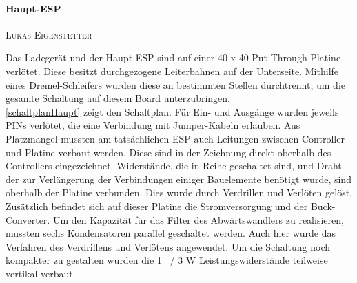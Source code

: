 \documentclass[12pt,a4paper,bibliography=totocnumbered,listof=totocnumbered]{article}
\makeatletter
\newcommand{\chapterauthor}[1]{%
  {\parindent0pt\vspace*{-5pt}%
  \linespread{1.1}\small\scshape#1%
  \par\nobreak\vspace*{3pt}}
  \@afterheading%
}
\makeatother
\begin{document}
\paragraph{Haupt-ESP}
\chapterauthor{Lukas Eigenstetter}
Das Ladegerät und der Haupt-ESP sind auf einer 40 x 40 Put-Through Platine verlötet.
Diese besitzt durchgezogene Leiterbahnen auf der Unterseite.
Mithilfe eines Dremel-Schleifers wurden diese an bestimmten Stellen durchtrennt, um die gesamte Schaltung auf diesem Board unterzubringen.\\
\autoref{schaltplanHaupt} zeigt den Schaltplan.
Für Ein- und Ausgänge wurden jeweils PINs verlötet, die eine Verbindung mit Jumper-Kabeln erlauben.
Aus Platzmangel mussten am tatsächlichen ESP auch Leitungen zwischen Controller und Platine verbaut werden.
Diese sind in der Zeichnung direkt oberhalb des Controllers eingezeichnet.
Widerstände, die in Reihe geschaltet sind, und Draht der zur Verlängerung der Verbindungen einiger Bauelemente benötigt wurde, sind oberhalb der Platine verbunden.
Dies wurde durch Verdrillen und Verlöten gelöst.\\
Zusätzlich befindet sich auf dieser Platine die Stromversorgung und der Buck-Converter.
Um den Kapazität für das Filter des Abwärtswandlers zu realisieren, mussten sechs Kondensatoren parallel geschaltet werden.
Auch hier wurde das Verfahren des Verdrillens und Verlötens angewendet.
Um die Schaltung noch kompakter zu gestalten wurden die 1 \textOmega \ / 3 W Leistungswiderstände teilweise vertikal verbaut.
\end{document}
